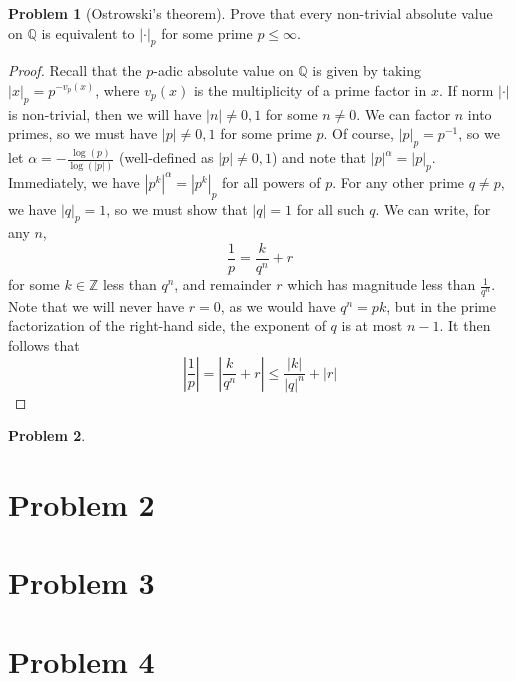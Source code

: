 \documentclass[aps,pra,showpacs,notitlepage,onecolumn,superscriptaddress,nofootinbib,oneside,10pt]{article}
\theoremstyle{definition}
\newtheorem{problem}{Problem}[section]
\begin{document}
\begin{problem}[Ostrowski's theorem]
  Prove that every non-trivial absolute value on $\mathbb{Q}$ is equivalent to $|\cdot|_p$ for some prime $p \leq \infty$.
  \end{problem}
\begin{proof}
  Recall that the $p$-adic absolute value on $\mathbb{Q}$ is given by taking $|x|_p = p^{-v_p(x)}$, where $v_p(x)$ is the multiplicity of a prime factor in $x$. If norm $|\cdot|$ is non-trivial, then
  we will have $|n| \neq 0, 1$ for some $n \neq 0$. We can factor $n$ into primes, so we must have $|p| \neq 0, 1$ for some prime $p$. Of course, $|p|_p = p^{-1}$, so we let $\alpha = -\frac{\log(p)}{\log(|p|)}$
  (well-defined as $|p| \neq 0, 1$) and note that $|p|^{\alpha} = |p|_p$. Immediately, we have $|p^k|^{\alpha} = |p^k|_p$ for all powers of $p$. For any other prime $q \neq p$, we have $|q|_p = 1$, so we must show
  that $|q| = 1$ for all such $q$. We can write, for any $n$,
  \begin{equation}
    \frac{1}{p} = \frac{k}{q^n} + r
    \end{equation}
  for some $k \in \mathbb{Z}$ less than $q^n$, and remainder $r$ which has magnitude less than $\frac{1}{q^n}$. Note that we will never have $r = 0$, as we would have $q^n = p k$, but in the prime factorization
  of the right-hand side, the exponent of $q$ is at most $n - 1$. It then follows that
  \begin{equation}
    \left| \frac{1}{p} \right| = \left| \frac{k}{q^n} + r \right| \leq \frac{|k|}{|q|^n} + |r|
    \end{equation}
\end{proof}

\begin{problem}
  \end{problem}

\section{Problem 2}

\section{Problem 3}

\section{Problem 4}
\end{document}
